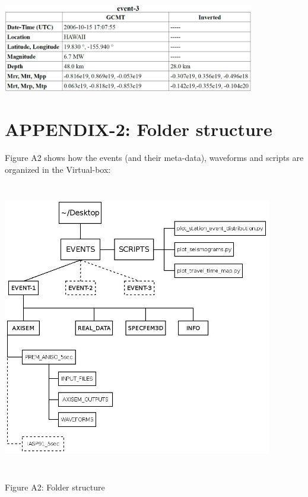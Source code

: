 \documentclass{article}
\begin{document}
\begin{center}
\vspace{1cm}
\includegraphics[width=312pt, height=110pt, keepaspectratio=true]{AXISEMTutorial-fig004.png}

\end{center}



\newpage

\section{APPENDIX-2: Folder structure}

Figure A2 shows how the events (and their meta-data), waveforms and scripts are 
organized in the Virtual-box:

\begin{center}
\includegraphics[width=334pt, height=362pt, keepaspectratio=true]{Folder_structure.jpeg}

Figure A2: Folder structure
\end{center}
\end{document}
